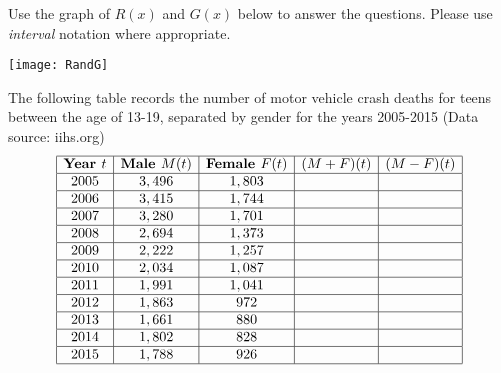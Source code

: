\documentclass[addpoints, 12pt] {exam}
\begin{document}
\begin{questions}
\question Use the graph of \(R(x)\) and \(G(x)\) below to answer the questions. Please use \emph{interval} notation where appropriate.\begin{center}
\texttt{[image: RandG]}\end{center}
 \newpage
\question The following table records the number of motor vehicle crash deaths for teens between the age of 13-19, separated by gender for the years 2005-2015 (Data source: iihs.org)
$$
\begin{array}{|c|c|c|c|c|}\hline
\textbf{Year }t&\textbf{Male }M(t)&\textbf{Female }F(t)&(M+F)(t)&(M-F)(t)\\\hline
2005&3,496&1,803&&\\\hline
2006&3,415&1,744&&\\\hline
2007&3,280&1,701&&\\\hline
2008&2,694&1,373&&\\\hline
2009&2,222&1,257&&\\\hline
2010&2,034&1,087&&\\\hline
2011&1,991&1,041&&\\\hline
2012&1,863&972&&\\\hline
2013&1,661&880&&\\\hline
2014&1,802&828&&\\\hline
2015&1,788&926&&\\\hline
\end{array}$$
\begin{parts}

\end{parts}
\end{questions}
\end{document}
